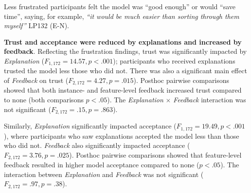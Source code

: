 Less frustrated participants felt the model was ``good enough'' or would ``save time'', saying, for example, %
\textit{``it would be much easier than sorting through them myself''} LP132 (E-N).

\textbf{Trust and acceptance were reduced by explanations and increased by feedback}.
%
Reflecting the frustration findings, trust was significantly impacted by \textit{Explanation} ($F_{1, 172}=14.57, p < .001$); participants who received explanations trusted the model less those who did not. There was also a significant main effect of \textit{Feedback} on trust ($F_{2, 172}=4.27, p = .015$). Posthoc pairwise comparisons showed that both instance- and feature-level feedback increased trust compared to none (both comparisons $p<.05$). The \textit{Explanation} $\times$ \textit{Feedback} interaction was not significant ($F_{2, 172}=.15, p=.863$).

Similarly, \textit{Explanation} significantly impacted acceptance ($F_{1, 172}=19.49, p < .001$), where participants who saw explanations accepted the model less than those who did not. 
\textit{Feedback} also significantly impacted acceptance ($F_{2, 172}=3.76, p=.025$). Posthoc pairwise comparisons showed that feature-level feedback resulted in higher model acceptance compared to none ($p<.05$). The interaction between \textit{Explanation} and \textit{Feedback} was not significant ($F_{2, 172}=.97, p=.38$).


